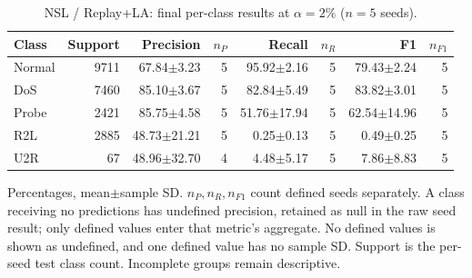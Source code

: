 \begin{table}[t]
\centering\scriptsize
\setlength{\tabcolsep}{3.3pt}
\caption{NSL / Replay+LA: final per-class results at $\alpha=2\%$ ($n=5$ seeds).}\label{tab:forgetting-class-nsl_kdd-replay-la}
\begin{tabular}{lrrrrrrr}
\toprule
Class & Support & Precision & $n_P$ & Recall & $n_R$ & F1 & $n_{F1}$ \\
\midrule
Normal & 9711 & 67.84$\pm$3.23 & 5 & 95.92$\pm$2.16 & 5 & 79.43$\pm$2.24 & 5 \\
DoS & 7460 & 85.10$\pm$3.67 & 5 & 82.84$\pm$5.49 & 5 & 83.82$\pm$3.01 & 5 \\
Probe & 2421 & 85.75$\pm$4.58 & 5 & 51.76$\pm$17.94 & 5 & 62.54$\pm$14.96 & 5 \\
R2L & 2885 & 48.73$\pm$21.21 & 5 & 0.25$\pm$0.13 & 5 & 0.49$\pm$0.25 & 5 \\
U2R & 67 & 48.96$\pm$32.70 & 4 & 4.48$\pm$5.17 & 5 & 7.86$\pm$8.83 & 5 \\
\bottomrule
\end{tabular}
\par\smallskip\begin{minipage}{0.98\textwidth}\scriptsize Percentages, mean$\pm$sample SD. $n_P,n_R,n_{F1}$ count defined seeds separately. A class receiving no predictions has undefined precision, retained as null in the raw seed result; only defined values enter that metric's aggregate. No defined values is shown as undefined, and one defined value has no sample SD. Support is the per-seed test class count. Incomplete groups remain descriptive.\end{minipage}
\end{table}

